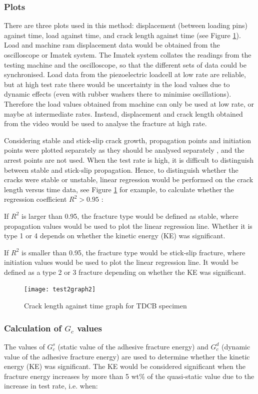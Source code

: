 \documentclass[numbers=noendperiod,chapterprefix=on]{icldt} %
\begin{document}
\subsubsection{Plots}
There are three plots used in this method: displacement (between loading pins) against time, load against time, and crack length against time (see Figure \ref{test2graph2}). 
Load and machine ram displacement data would be obtained from the oscilloscope or Imatek system. The Imatek system collates the readings from the testing machine and the oscilloscope, so that the different sets of data could be synchronised. Load data from the piezoelectric loadcell at low rate are reliable, but at high test rate there would be uncertainty in the load values due to dynamic effects (even with rubber washers there to minimise oscillations). Therefore the load values obtained from machine can only be used at low rate, or maybe at intermediate rates. Instead, displacement and crack length obtained from the video would be used to analyse the fracture at high rate. 

Considering stable and stick-slip crack growth, propagation points and initiation points were plotted separately as they should be analysed separately \cite{Adnan2008}, and the arrest points are not used. When the test rate is high, it is difficult to distinguish between stable and stick-slip propagation. Hence, to distinguish whether the cracks were stable or unstable, linear regression would be performed on the crack length versus time data, see Figure \ref{test2graph2} for example, to calculate whether the regression coefficient $R^2 > 0.95$ \cite{Huang1992}:

If $R^2$ is larger than 0.95, the fracture type would be defined as stable, where propagation values would be used to plot the linear regression line. Whether it is type 1 or 4 depends on whether the kinetic energy (KE) was significant. 

If $R^2$ is smaller than 0.95, the fracture type would be stick-slip fracture, where initiation values would be used to plot the linear regression line. It would be defined as a type 2 or 3 fracture depending on whether the KE was significant.

\begin{figure}[!htpb]
\centering
\texttt{[image: test2graph2]}
\caption{Crack length against time graph for TDCB specimen} \label{test2graph2}
\end{figure}
\FloatBarrier

\subsubsection{Calculation of $G_c$ values} \label{Analysis_crack}
The values of $G^s_c$ (static value of the adhesive fracture energy) and $G^d_c$ (dynamic value of the adhesive fracture energy) are used to determine whether the kinetic energy (KE) was significant. The KE would be considered significant when the fracture energy increases by more than 5 wt\% of the quasi-static value due to the increase in test rate, i.e. when: 
\end{document}
